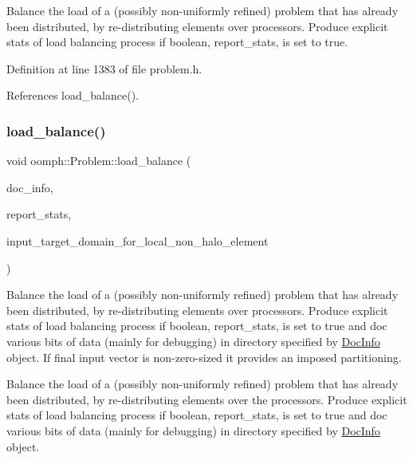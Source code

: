 Balance the load of a (possibly non-\/uniformly refined) problem that has already been distributed, by re-\/distributing elements over processors. Produce explicit stats of load balancing process if boolean, report\+\_\+stats, is set to true. 



Definition at line 1383 of file problem.\+h.



References load\+\_\+balance().

\mbox{\label{classoomph_1_1Problem_a7492ddb5663552ce8f61f1ef73c86a9d}} 
\subsubsection{\texorpdfstring{load\+\_\+balance()}{load\_balance()}\hspace{0.1cm}{\footnotesize\ttfamily [4/4]}}
{\footnotesize\ttfamily void oomph\+::\+Problem\+::load\+\_\+balance (\begin{DoxyParamCaption}\item[{\hyperlink{classoomph_1_1DocInfo}{Doc\+Info} \&}]{doc\+\_\+info,  }\item[{const bool \&}]{report\+\_\+stats,  }\item[{const \hyperlink{classoomph_1_1Vector}{Vector}$<$ unsigned $>$ \&}]{input\+\_\+target\+\_\+domain\+\_\+for\+\_\+local\+\_\+non\+\_\+halo\+\_\+element }\end{DoxyParamCaption})}



Balance the load of a (possibly non-\/uniformly refined) problem that has already been distributed, by re-\/distributing elements over processors. Produce explicit stats of load balancing process if boolean, report\+\_\+stats, is set to true and doc various bits of data (mainly for debugging) in directory specified by \hyperlink{classoomph_1_1DocInfo}{Doc\+Info} object. If final input vector is non-\/zero-\/sized it provides an imposed partitioning. 

Balance the load of a (possibly non-\/uniformly refined) problem that has already been distributed, by re-\/distributing elements over the processors. Produce explicit stats of load balancing process if boolean, report\+\_\+stats, is set to true and doc various bits of data (mainly for debugging) in directory specified by \hyperlink{classoomph_1_1DocInfo}{Doc\+Info} object. 

